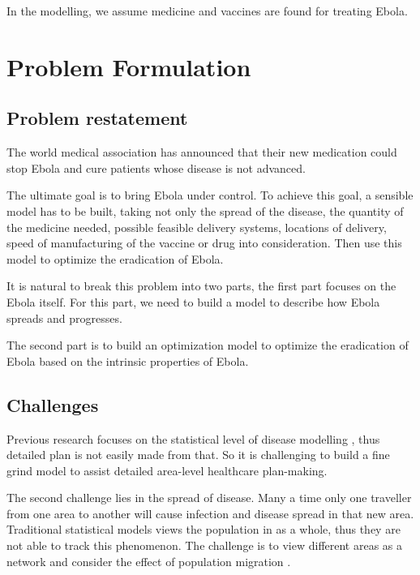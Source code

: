 \documentclass[11pt]{article}
\begin{document}
In the modelling, we assume medicine and vaccines are found for treating Ebola.


\section{Problem Formulation}



\subsection{Problem restatement}

The world medical association has announced that their new medication could stop Ebola and cure patients whose disease is not advanced. 

The ultimate goal is to bring Ebola under control. To achieve this goal, a sensible model has to be built, taking not only the spread of the disease, the quantity of the medicine needed, possible feasible delivery systems, locations of delivery, speed of manufacturing of the vaccine or drug into consideration. Then use this model to optimize the eradication of Ebola.

It is natural to break this problem into two parts, the first part focuses on the Ebola itself. For this part, we need to build a model to describe how Ebola spreads and progresses. 

The second part is to build an optimization model to optimize the eradication of Ebola based on the intrinsic properties of Ebola. 
\subsection{Challenges}

Previous research focuses on the statistical level of disease modelling\cite{anderson1992infectious}\cite{lekone2006statistical}\cite{ivorra2014codis}\cite{team2014ebola}\cite{chowell2014transmission}   , thus detailed plan is not easily made from that. So it is challenging to build a fine grind model to assist detailed area-level healthcare plan-making.

The second challenge lies in the spread of disease. Many a time only one traveller from one area to another will cause infection and disease spread in that new area. Traditional statistical models views the population in as a whole, thus they are not able to track this phenomenon. The challenge is to view different areas as a network and consider the effect of population migration\cite{basharpredicting} .
\end{document}
